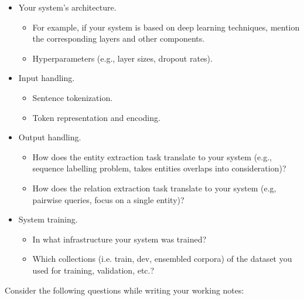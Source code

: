 \documentclass[
]{ceurart}
\begin{document}
\begin{itemize}
    \item Your system's architecture.
        \begin{itemize}
            \item For example, if your system is based on deep learning techniques, mention the corresponding layers and other components.
            \item Hyperparameters (e.g., layer sizes, dropout rates).
        \end{itemize}
    \item Input handling.
        \begin{itemize}
            \item Sentence tokenization.
            \item Token representation and encoding.
        \end{itemize}
    \item Output handling.
        \begin{itemize}
            \item How does the entity extraction task translate to your system (e.g., sequence labelling problem, takes entities overlaps into consideration)?
            \item How does the relation extraction task translate to your system (e.g, pairwise queries, focus on a single entity)?
        \end{itemize}
    \item System training.
    \begin{itemize}
        \item In what infrastructure your system was trained?
        \item Which collections (i.e. train, dev, ensembled corpora) of the dataset you used for training, validation, etc.?
    \end{itemize}
\end{itemize}

Consider the following questions while writing your working notes:
\end{document}
